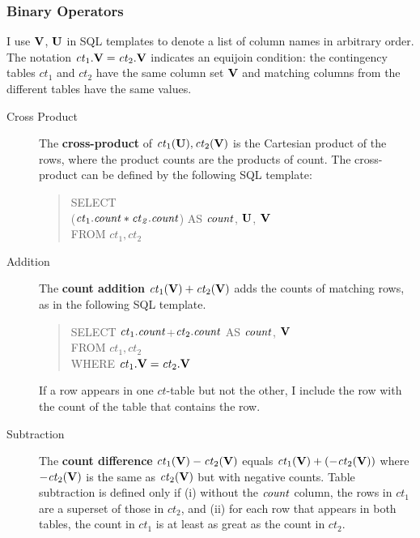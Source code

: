 \documentclass{sfuthesis}
\newcommand{\ct}{\mathit{ct}}
\begin{document}
\subsubsection{Binary Operators} \label{sec:bin}
I  use $\mathbf{V}$, $\mathbf{U}$ in SQL templates to denote a list of column names in arbitrary order. The notation $\ct_{1}.\set{V} = \ct_{2}.\set{V}$ indicates an equijoin condition: the contingency tables $\ct_{1}$ and $\ct_{2}$ have the same column set $\mathbf{V}$ and matching columns from the different tables have the same values.
\begin{description}
\item[Cross Product] 
The \textbf{cross-product} of $\ct_{1}(\set{U}),\ct_{2}(\set{V})$ is the Cartesian product of the rows, where the product counts are the products of count. The cross-product can be defined by the following SQL template:
\begin{quote}
SELECT \\($\ct_{1}.\qcount *\ct_{2}.\qcount$) AS $\it{count}$,  $\mathbf{U}$, $\mathbf{V}$\\
FROM  $\ct_{1},\ct_{2}$
\end{quote}


\item[Addition] 
 The \textbf{count addition} $\ct_{1}(\set{V}) + \ct_{2}(\set{V})$ adds the counts of matching rows, as in the following SQL template.
\begin{quote}
SELECT %
$\ct_{1}.\qcount$+$\ct_{2}.\qcount$ AS $\it{count}$, $\mathbf{V}$ \\%
FROM  $\ct_{1},\ct_{2}$\\
WHERE $\ct_{1}.\set{V} = \ct_{2}.\set{V}$
\end{quote}

If a row appears in one $\ct$-table but not the other, I  include the row with the count of the table that contains the row. 

\item[Subtraction] %
The \textbf{count difference} $\ct_{1}(\set{V}) - \ct_{2}(\set{V})$ equals $\ct_{1}(\set{V}) + (- \ct_{2}(\set{V}))$ where $- \ct_{2}(\set{V})$ is the same as $\ct_{2}(\set{V})$ but with negative counts. 
Table subtraction is defined only if (i) without the $\it{count}$ column, the rows in $\ct_{1}$ are a superset of those in $\ct_{2}$, and (ii) for each row that appears in both tables, the count in $\ct_{1}$ is at least as great as the count in $\ct_{2}$.
\end{description}
\end{document}
